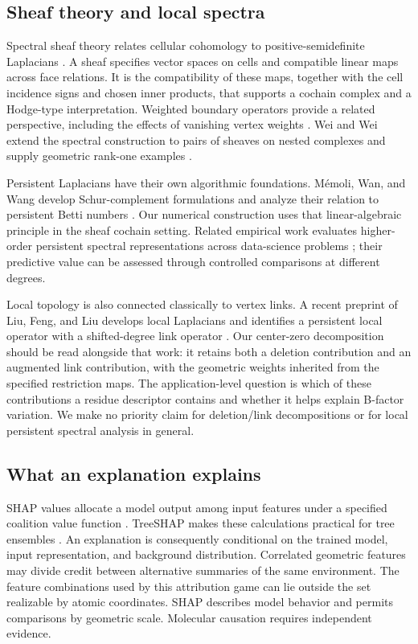 \documentclass[11pt]{article}
\begin{document}
\subsection{Sheaf theory and local spectra}
Spectral sheaf theory relates cellular cohomology to positive-semidefinite Laplacians \citep{hansen2019}. A sheaf specifies vector spaces on cells and compatible linear maps across face relations. It is the compatibility of these maps, together with the cell incidence signs and chosen inner products, that supports a cochain complex and a Hodge-type interpretation. Weighted boundary operators provide a related perspective, including the effects of vanishing vertex weights \citep{renwu2021}. Wei and Wei extend the spectral construction to pairs of sheaves on nested complexes and supply geometric rank-one examples \citep{wei2025}.

Persistent Laplacians have their own algorithmic foundations. M\'emoli, Wan, and Wang develop Schur-complement formulations and analyze their relation to persistent Betti numbers \citep{memoli2022}. Our numerical construction uses that linear-algebraic principle in the sheaf cochain setting. Related empirical work evaluates higher-order persistent spectral representations across data-science problems \citep{davies2023}; their predictive value can be assessed through controlled comparisons at different degrees.

Local topology is also connected classically to vertex links. A recent preprint of Liu, Feng, and Liu develops local Laplacians and identifies a persistent local operator with a shifted-degree link operator \citep{liu2026}. Our center-zero decomposition should be read alongside that work: it retains both a deletion contribution and an augmented link contribution, with the geometric weights inherited from the specified restriction maps. The application-level question is which of these contributions a residue descriptor contains and whether it helps explain B-factor variation. We make no priority claim for deletion/link decompositions or for local persistent spectral analysis in general.

\subsection{What an explanation explains}
SHAP values allocate a model output among input features under a specified coalition value function \citep{lundberg2017}. TreeSHAP makes these calculations practical for tree ensembles \citep{lundberg2020}. An explanation is consequently conditional on the trained model, input representation, and background distribution. Correlated geometric features may divide credit between alternative summaries of the same environment. The feature combinations used by this attribution game can lie outside the set realizable by atomic coordinates. SHAP describes model behavior and permits comparisons by geometric scale. Molecular causation requires independent evidence.
\end{document}
